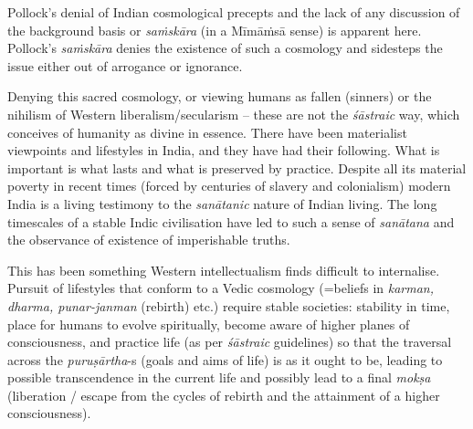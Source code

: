 Pollock's denial of Indian cosmological precepts and the lack of any discussion of the background basis or {\sl saṁskāra} (in a Mīmāṁsā sense) is apparent here. Pollock's {\sl saṁskāra} denies the existence of such a cosmology and sidesteps the issue either out of arrogance or ignorance.

Denying this sacred cosmology, or viewing humans as fallen (sinners) or the nihilism of Western liberalism/secularism -- these are not the {\sl śāstraic} way, which conceives of humanity as divine in essence. There have been materialist viewpoints and lifestyles in India, and they have had their following. What is important is what lasts and what is preserved by practice. Despite all its material poverty in recent times (forced by centuries of slavery and colonialism) modern India is a living testimony to the {\sl sanātanic} nature of Indian living. The long timescales of a stable Indic civilisation have led to such a sense of {\sl sanātana} and the observance of existence of imperishable truths.

This has been something Western intellectualism finds difficult to internalise. Pursuit of lifestyles that conform to a Vedic cosmology (=beliefs in {\sl karman, dharma, punar-janman} (rebirth) etc.) require stable societies: stability in time, place for humans to evolve spiritually, become aware of higher planes of consciousness, and practice life (as per {\sl śāstraic} guidelines) so that the traversal across the \hbox{{\sl puruṣārtha}-s} (goals and aims of life) is as it ought to be, leading to  possible transcendence in the current life and possibly lead to a final {\sl mokṣa}  (liberation / escape from the cycles of rebirth and the attainment of a higher consciousness).

